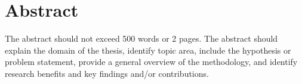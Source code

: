 
\section*{Abstract} 
The abstract should not exceed 500 words or 2 pages. The abstract should explain the domain of the thesis, identify topic area, include the hypothesis or problem statement, provide a general overview of the methodology, and identify research benefits and key findings and/or contributions.



\cleardoublepage
